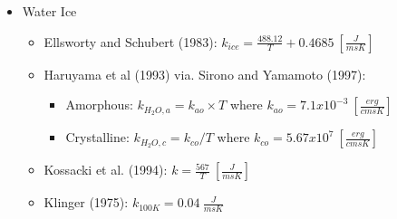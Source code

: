 \documentclass[11pt]{article} %
\begin{document}
	\begin{itemize}
	\item Water Ice
		\begin{itemize}
		\item Ellsworty and Schubert (1983): $k_{ice} = \frac{488.12}{T} +0.4685 \: [\frac{J}{m s K}]$
		\item Haruyama et al (1993) via. Sirono and Yamamoto (1997):
			\begin{itemize}
			\item Amorphous: $k_{H_{2}O, a} = k_{ao} \times T$ where $k_{ao} = 7.1x10^{-3} \: [\frac{erg}{cm s K}]$
			\item Crystalline: $k_{H_{2}O, c} = k_{co}/T$ where $k_{co} = 5.67x10^{7} \: [\frac{erg}{cm s K}]$
			\end{itemize}
		\item Kossacki et al. (1994): $k = \frac{567}{T} \: [\frac{J}{m s K}]$
		\item Klinger (1975): $k_{100 K} = 0.04  \: \frac{J}{m s K}$
		\end{itemize}
	\end{itemize}
\end{document}
